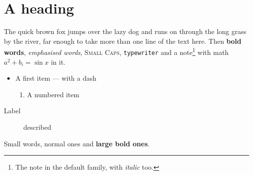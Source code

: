 \documentclass{article}
\begin{document}
\section{A heading}
The quick brown fox jumps over the lazy dog and runs on through the long grass by the river, far enough to take more than one line of the text here. Then \textbf{bold words}, \emph{emphasised words}, \textsc{Small Caps}, \texttt{typewriter} and a note\footnote{The note in the default family, with \textit{italic} too.} with math $a^2+b_i = \sin x$ in it.
\begin{itemize}
\item A first item --- with a dash
\begin{enumerate}
\item A numbered item
\end{enumerate}
\end{itemize}
\begin{description}
\item[Label] described
\end{description}
{\small Small words, \textnormal{normal} ones} and {\large\bfseries large bold ones}.
\end{document}
